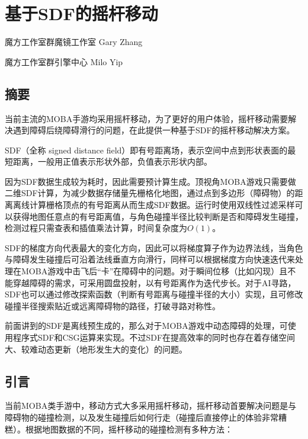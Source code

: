 \hypertarget{ux57faux4e8esdfux7684ux6447ux6746ux79fbux52a8}{%
\chapter{基于SDF的摇杆移动}\label{ux57faux4e8esdfux7684ux6447ux6746ux79fbux52a8}}

魔方工作室群魔镜工作室 Gary Zhang

魔方工作室群引擎中心 Milo Yip

\hypertarget{ux6458ux8981}{%
\section*{摘要}\label{ux6458ux8981}}

当前主流的MOBA手游均采用摇杆移动，为了更好的用户体验，摇杆移动需要解决遇到障碍后绕障碍滑行的问题，在此提供一种基于SDF的摇杆移动解决方案。

SDF（全称 signed distance
field）即有号距离场，表示空间中点到形状表面的最短距离，一般用正值表示形状外部，负值表示形状内部。

因为SDF数据生成较为耗时，因此需要预计算生成。顶视角MOBA游戏只需要做二维SDF计算，为减少数据存储量先栅格化地图，通过点到多边形（障碍物）的距离离线计算栅格顶点的有号距离从而生成SDF数据。运行时使用双线性过滤采样可以获得地图任意点的有号距离值，与角色碰撞半径比较判断是否和障碍发生碰撞，检测过程只需查表和插值乘法计算，时间复杂度为\(O(1)\)。

SDF的梯度方向代表最大的变化方向，因此可以将梯度算子作为边界法线，当角色与障碍发生碰撞后可沿着法线垂直方向滑行，同样可以根据梯度方向快速迭代来处理在MOBA游戏中击飞后``卡''在障碍中的问题。对于瞬间位移（比如闪现）且不能穿越障碍的需求，可采用圆盘投射，以有号距离作为迭代步长。对于AI寻路，SDF也可以通过修改探索函数（判断有号距离与碰撞半径的大小）实现，且可修改碰撞半径搜索贴近或远离障碍物的路径，打破寻路对称性。

前面讲到的SDF是离线预生成的，那么对于MOBA游戏中动态障碍的处理，可使用程序式SDF和CSG运算来实现。不过SDF在提高效率的同时也存在着存储空间大、较难动态更新（地形发生大的变化）的问题。

\hypertarget{ux5f15ux8a00}{%
\section{引言}\label{ux5f15ux8a00}}

当前MOBA类手游中，移动方式大多采用摇杆移动，摇杆移动首要解决问题是与障碍物的碰撞检测，以及发生碰撞后如何行走（碰撞后直接停止的体验非常糟糕）。根据地图数据的不同，摇杆移动的碰撞检测有多种方法：

